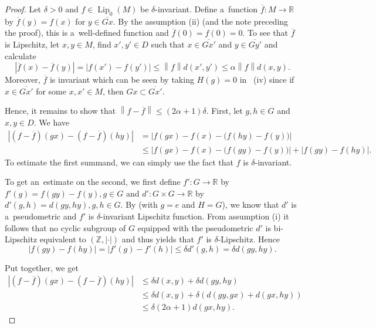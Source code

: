 \documentclass[11pt,a4paper]{amsart}
\theoremstyle{definition}
\newcommand{\R}{\mathbb{R}}
\newcommand{\Z}{\mathbb{Z}}
\newcommand{\fBar}{\overline{f}}
\newcommand{\abs}[1]{\left| #1 \right|}
\newcommand{\norm}[1]{\left\| #1 \right\|}
\newcommand{\Lipz}{\operatorname{Lip}_0}
\begin{document}
	\begin{proof}
		Let $\delta > 0$ and $f \in \Lipz(M)$ be $\delta$-invariant.		
		Define a~function $\fBar: M \to \R$ by $\fBar(y) = f(x)$ for $y \in \overline{Gx}$.	By the assumption (ii) (and the note preceding the proof), this is a~well-defined function and $\fBar(0) = f(0) = 0$. To see that $\fBar$ is Lipschitz, let $x, y \in M$, find $x', y' \in D$ such that $x \in \overline{Gx'}$ and $y \in \overline{Gy'}$ and calculate
		\begin{equation*}
			\abs{\fBar(x) - \fBar(y)} = \abs{f(x') - f(y')} \leq \norm{f}d(x', y') \leq \alpha\norm{f}d(x, y).
		\end{equation*}
		Moreover, $\fBar$ is invariant which can be seen by taking $H(g) = 0$ in~ (iv) since if $x \in \overline{Gx'}$ for some $x, x' \in M$, then $Gx \subset \overline{Gx'}$.
		
		Hence, it remains to show that $\norm{f-\fBar} \leq (2\alpha + 1)\delta$. First, let $g, h \in G$ and $x, y \in D$. We have
		\begin{align*}
			\abs{(f-\fBar)(gx) - (f-\fBar)(hy)}
			&= \abs{f(gx) - f(x) - \big(f(hy) - f(y)\big)}\\
			&\leq \abs{f(gx) - f(x) - \big(f(gy) - f(y)\big)} + \abs{f(gy) - f(hy)}.
		\end{align*}
		To estimate the first summand, we can simply use the fact that $f$ is $\delta$-invariant.
		
		To get an~estimate on the second, we first define $f': G \to \R$ by $f'(g) = f(gy) - f(y), g \in G$ and $d': G \times G \to \R$ by $d'(g, h) = d(gy, hy), g,h \in G$. By  (with $g = e$ and $H = G$), we know that $d'$ is a~pseudometric and $f'$ is $\delta$-invariant Lipschitz function. From assumption (i) it follows that no cyclic subgroup of $G$ equipped with the pseudometric $d'$ is bi-Lipschitz equivalent to $(\Z, \abs{\cdot})$ and thus  yields that $f'$ is $\delta$-Lipschitz. Hence
		\begin{equation*}
			\abs{f(gy) - f(hy)}
			= \abs{f'(g) - f'(h)}
			\leq \delta d'(g, h)
			= \delta d(gy, hy).
		\end{equation*}
		
		Put together, we get
		\begin{align*}
			\abs{(f-\fBar)(gx) - (f-\fBar)(hy)}
			&\leq \delta d(x, y) + \delta d(gy, hy)\\
			&\leq \delta d(x, y) + \delta(d(gy, gx) + d(gx, hy))\\
			&\leq \delta (2\alpha + 1) d(gx, hy).
		\end{align*}
		

\end{proof}
\end{document}
